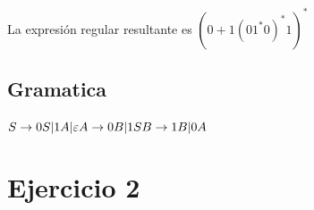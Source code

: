 \documentclass[12pt, spanish]{article}
\begin{document}
La expresión regular resultante es \begin{math}
(0+1(01^{*}0)^{*}1)^{*}
\end{math}

\subsection{Gramatica}

\begin{math}
S\rightarrow 0S|1A|\varepsilon \\
A\rightarrow 0B|1S\\
B\rightarrow 1B|0A
\end{math}


\section{Ejercicio 2}
\end{document}
